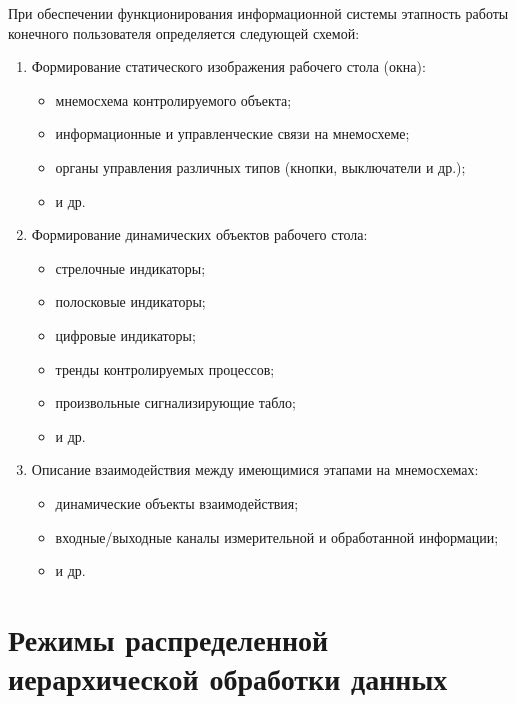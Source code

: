 При обеспечении функционирования информационной системы этапность
работы конечного пользователя определяется следующей схемой:
\begin{enumerate}
\item Формирование статического изображения рабочего стола (окна):
  \begin{itemize}
  \item мнемосхема контролируемого объекта;
  \item информационные и управленческие связи на мнемосхеме;
  \item органы управления различных типов (кнопки, выключатели и др.);
  \item и др.
  \end{itemize}
\item Формирование динамических объектов рабочего стола:
  \begin{itemize}
  \item стрелочные индикаторы;
  \item полосковые индикаторы;
  \item цифровые индикаторы;
  \item тренды контролируемых процессов;
  \item произвольные сигнализирующие табло;
  \item и др.
  \end{itemize}
\item Описание взаимодействия между имеющимися этапами на мнемосхемах:
  \begin{itemize}
  \item динамические объекты взаимодействия;
  \item входные/выходные каналы измерительной и обработанной
    информации;
  \item и др.
  \end{itemize}
\end{enumerate}

\section{Режимы распределенной иерархической обработки данных}

